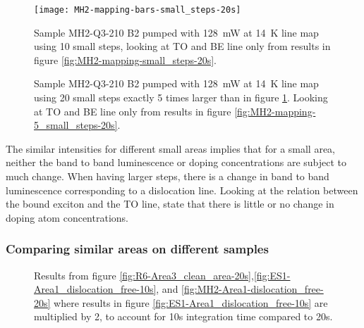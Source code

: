 
\begin{figure}[H]
\centering
\texttt{[image: MH2-mapping-bars-small\_steps-20s]}
\caption[MH2-Q3-210 line mapping]{Sample MH2-Q3-210 B2 pumped with 128~mW at 14~K line map using 10 small steps, looking at TO and BE line only from results in figure \ref{fig:MH2-mapping-small_steps-20s}.}
\label{fig:MH2-mapping-bars-small_steps-20s}%
\end{figure}



\begin{figure}[H]
\centering
{}
\label{fig:MH2-5stepmapping}
\caption[MH2-Q3-210 line mapping]{Sample MH2-Q3-210 B2 pumped with 128~mW at 14~K line map using 20 small steps exactly 5 times larger than in figure \ref{fig:MH2-mapping-bars-small_steps-20s}. Looking at TO and BE line only from results in figure \ref{fig:MH2-mapping-5_small_steps-20s}.}
\end{figure}


The similar intensities for different small areas implies that for a small area, neither the band to band luminescence or doping concentrations are subject to much change. When having larger steps, there is a change in band to band luminescence corresponding to a dislocation line. Looking at the relation between the bound exciton and the TO line, \cite{tajima78} state that there is little or no change in doping atom concentrations.



\subsubsection{Comparing similar areas on different samples}


\begin{figure}[H]
\centering

\caption[Comparisons in a clean area]{Results from figure \ref{fig:R6-Area3_clean_area-20s},\ref{fig:ES1-Area1_dislocation_free-10s}, and \ref{fig:MH2-Area1-dislocation_free-20s} where results in figure \ref{fig:ES1-Area1_dislocation_free-10s} are multiplied by 2, to account for 10s integration time compared to 20s.}
\label{fig:comparisons_of_a_clean_area}
\end{figure}


